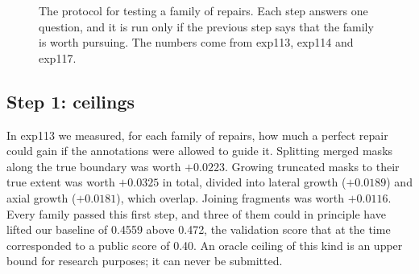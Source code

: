 \begin{figure}[t]
\centering
{}
\caption{The protocol for testing a family of repairs. Each step answers one question, and it is run
only if the previous step says that the family is worth pursuing. The numbers come from exp113, exp114
and exp117. }
\label{fig:post-protocol}
\end{figure}

\subsection{Step 1: ceilings}\label{sec:post-ceilings}
In exp113 we measured, for each family of repairs, how much a perfect repair could gain if the
annotations were allowed to guide it. Splitting merged masks along the true boundary was worth
$+0.0223$. Growing truncated masks to their true extent was worth $+0.0325$ in total, divided into
lateral growth ($+0.0189$) and axial growth ($+0.0181$), which overlap. Joining fragments was worth
$+0.0116$. Every family passed this first step, and three of them could in principle have lifted our
baseline of 0.4559 above 0.472, the validation score that at the time corresponded to a public score
of 0.40. An oracle ceiling of this kind is an upper bound for research purposes; it can never be
submitted.


